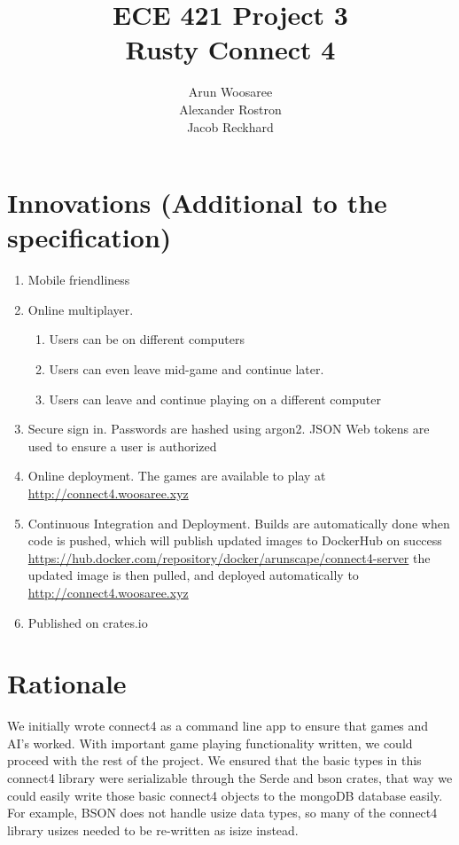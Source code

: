 \documentclass[letterpaper]{article}
\title{ECE 421 Project 3\\
Rusty Connect 4}
\author{Arun Woosaree\\
Alexander Rostron\\
Jacob Reckhard
}
\begin{document}
\maketitle %


\section{Innovations (Additional to the specification)}
\begin{enumerate}
    \item Mobile friendliness
    \item Online multiplayer.
        \begin{enumerate}
            \item Users can be on different computers
            \item Users can even leave mid-game and continue later.
            \item Users can leave and continue playing on a different computer
        \end{enumerate}
    \item Secure sign in. Passwords are hashed using argon2. JSON Web tokens are used to ensure a user
        is authorized
    \item Online deployment. The games are available to play at \url{http://connect4.woosaree.xyz}
    \item Continuous Integration and Deployment. Builds are automatically done when code is pushed,
        which will publish updated images to DockerHub on success \url{https://hub.docker.com/repository/docker/arunscape/connect4-server}
        the updated image is then pulled, and deployed automatically to \url{http://connect4.woosaree.xyz}
    \item Published on crates.io

\end{enumerate}

\section{Rationale}

We initially wrote connect4 as a command line app to ensure that games and AI's worked. With important game playing functionality written, we could proceed with the rest of the project. We ensured that the basic types in this connect4 library were serializable through the Serde and bson crates, that way we could easily write those basic connect4 objects to the mongoDB database easily. For example, BSON does not handle usize data types, so many of the connect4 library usizes needed to be re-written as isize instead.
\end{document}
